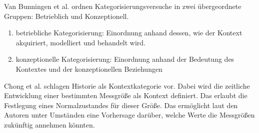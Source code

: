 Van Bunningen et al. \cite{van2005context} ordnen Kategorisierungsversuche in zwei übergeordnete Gruppen: Betrieblich und Konzeptionell. 
\begin{enumerate}
\item{betriebliche Kategorisierung: Einordnung anhand dessen, wie der Kontext akquiriert, modelliert und behandelt wird.}
\item{konzeptionelle Kategorisierung: Einordnung anhand der Bedeutung des Kontextes und der konzeptionellen Beziehungen}
\end{enumerate}
Chong et al. \cite{chong_context-aware_nodate} schlagen Historie als Kontextkategorie vor. Dabei wird die zeitliche Entwicklung einer bestimmten Messgröße als Kontext definiert. Das erlaubt die Festlegung eines Normalzustandes für dieser Größe. Das ermöglicht laut den Autoren unter Umständen eine Vorhersage darüber, welche Werte die Messgrößen zukünftig annehmen könnten.


